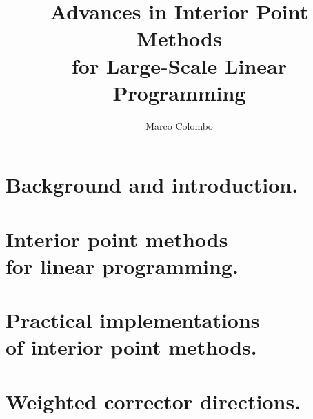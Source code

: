 \documentclass[phd,leftchapter]{msthesis}
\title{Advances in Interior Point Methods \\
       for Large-Scale Linear Programming}
\author{Marco Colombo}
\begin{document}
\maketitle

\dedication{
            Se'n foi me de chesta br\"ogna ch\'e? \\
\vspace{3em}
            If nothing else it true, well this is \\
	    If nothing else meant anything \\
	    the silence ended and I forgot, I forgot, I forgot. \\
\vspace{3em}
            I wish that I could find it, I wish I'd let it go \\
	    I wish my arms could hold it, will I ever know? \\
	    It may or may not happen\dots
}
\standarddeclaration

%
%
\begin{abstract}
  
\end{abstract}

%
%
\begin{acknowledgements}
  
\end{acknowledgements}

%
%
\tableofcontents

%
%
\chapter{Background and introduction.}


\chapter[Interior point methods for linear programming.]{Interior point methods \\ for linear programming.}


\chapter[Practical implementations of interior point methods.]{Practical implementations \\ of interior point methods.}


\chapter{Weighted corrector directions.}

\end{document}
